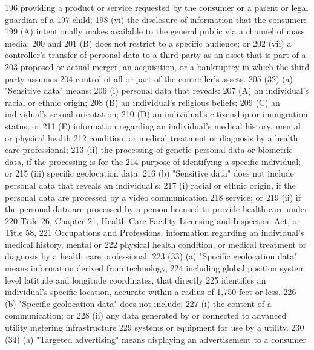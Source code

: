 196     providing a product or service requested by the consumer or a parent or legal guardian of a
197     child;
198          (vi) the disclosure of information that the consumer:
199          (A) intentionally makes available to the general public via a channel of mass media;
200     and
201          (B) does not restrict to a specific audience; or
202          (vii) a controller's transfer of personal data to a third party as an asset that is part of a
203     proposed or actual merger, an acquisition, or a bankruptcy in which the third party assumes
204     control of all or part of the controller's assets.
205          (32) (a) "Sensitive data" means:
206          (i) personal data that reveals:
207          (A) an individual's racial or ethnic origin;
208          (B) an individual's religious beliefs;
209          (C) an individual's sexual orientation;
210          (D) an individual's citizenship or immigration status; or
211          (E) information regarding an individual's medical history, mental or physical health
212     condition, or medical treatment or diagnosis by a health care professional;
213          (ii) the processing of genetic personal data or biometric data, if the processing is for the
214     purpose of identifying a specific individual; or
215          (iii) specific geolocation data.
216          (b) "Sensitive data" does not include personal data that reveals an individual's:
217          (i) racial or ethnic origin, if the personal data are processed by a video communication
218     service; or
219          (ii) if the personal data are processed by a person licensed to provide health care under
220     Title 26, Chapter 21, Health Care Facility Licensing and Inspection Act, or Title 58,
221     Occupations and Professions, information regarding an individual's medical history, mental or
222     physical health condition, or medical treatment or diagnosis by a health care professional.
223          (33) (a) "Specific geolocation data" means information derived from technology,
224     including global position system level latitude and longitude coordinates, that directly
225     identifies an individual's specific location, accurate within a radius of 1,750 feet or less.
226          (b) "Specific geolocation data" does not include:
227          (i) the content of a communication; or
228          (ii) any data generated by or connected to advanced utility metering infrastructure
229     systems or equipment for use by a utility.
230          (34) (a) "Targeted advertising" means displaying an advertisement to a consumer
